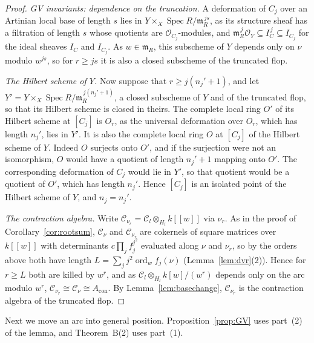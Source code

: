 \documentclass[11pt]{amsart}
\numberwithin{table}{section}
\numberwithin{figure}{section}
\numberwithin{equation}{section}
\theoremstyle{definition}
\theoremstyle{plain}
\newcommand{\Acon}{A_{\mathrm{con}}}
\newcommand{\cC}{\mathcal{C}}
\newcommand{\cO}{\mathcal{O}}
\DeclareMathOperator{\Spec}{Spec}
\DeclareMathOperator{\ord}{ord}
\begin{document}
\begin{proof}
\emph{GV invariants: dependence on the truncation.} A deformation of $C_j$ over an Artinian local base of length $s$ lies in $Y \times_X \Spec R/\mathfrak m_R^{\,js}$, as its structure sheaf has a filtration of length $s$ whose quotients are $\cO_{C_j}$-modules, and $\mathfrak m_R^{\,j}\cO_Y \subseteq I_C^{\,j} \subseteq I_{C_j}$ for the ideal sheaves $I_C$ and $I_{C_j}$. As $w \in \mathfrak m_R$, this subscheme of $Y$ depends only on $\nu$ modulo $w^{js}$, so for $r \ge js$ it is also a closed subscheme of the truncated flop.

\emph{The Hilbert scheme of $Y$.} Now suppose that $r \ge j(n_j' + 1)$, and let $Y' = Y \times_X \Spec R/\mathfrak m_R^{\,j(n_j' + 1)}$, a closed subscheme of $Y$ and of the truncated flop, so that its Hilbert scheme is closed in theirs. The complete local ring $O'$ of its Hilbert scheme at $[C_j]$ is $O_r$, as the universal deformation over $O_r$, which has length $n_j'$, lies in $Y'$. It is also the complete local ring $O$ at $[C_j]$ of the Hilbert scheme of $Y$. Indeed $O$ surjects onto $O'$, and if the surjection were not an isomorphism, $O$ would have a quotient of length $n_j' + 1$ mapping onto $O'$. The corresponding deformation of $C_j$ would lie in $Y'$, so that quotient would be a quotient of $O'$, which has length $n_j'$. Hence $[C_j]$ is an isolated point of the Hilbert scheme of $Y$, and $n_j = n_j'$.

\emph{The contraction algebra.} Write $\cC_{\nu_r} = \cC_l \otimes_{H_l} k[[w]]$ via $\nu_r$. As in the proof of Corollary~\ref{cor:rootsum}, $\cC_\nu$ and $\cC_{\nu_r}$ are cokernels of square matrices over $k[[w]]$ with determinants $c\prod_j f_j^{j^2}$ evaluated along $\nu$ and $\nu_r$, so by the orders above both have length $L = \sum_j j^2 \ord_w f_j(\nu)$ (Lemma~\ref{lem:dvr}(2)). Hence for $r \ge L$ both are killed by $w^r$, and as $\cC_l \otimes_{H_l} k[w]/(w^r)$ depends only on the arc modulo $w^r$, $\cC_{\nu_r} \cong \cC_\nu \cong \Acon$. By Lemma~\ref{lem:basechange}, $\cC_{\nu_r}$ is the contraction algebra of the truncated flop.
\end{proof}

Next we move an arc into general position. Proposition~\ref{prop:GV} uses part~(2) of the lemma, and Theorem~B(2) uses part~(1).
\end{document}
